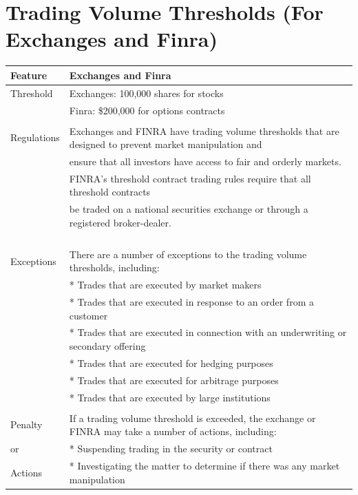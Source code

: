 \documentclass[11pt]{article}
\begin{document}
\section{Trading Volume Thresholds (For Exchanges and Finra)}
\label{sec:orgcc04caa}
\begin{center}
\begin{tabular}{ll}
\hline
Feature & Exchanges and Finra\\[0pt]
\hline
Threshold & Exchanges: 100,000 shares for stocks\\[0pt]
 & Finra:     \$200,000 for options contracts\\[0pt]
 & \\[0pt]
Regulations & Exchanges and FINRA have trading volume thresholds that are designed to prevent market manipulation and\\[0pt]
 & ensure that all investors have access to fair and orderly markets.\\[0pt]
 & FINRA's threshold contract trading rules require that all threshold contracts\\[0pt]
 & be traded on a national securities exchange or through a registered broker-dealer.\\[0pt]
 & \\[0pt]
 & \\[0pt]
 & \\[0pt]
 & \\[0pt]
Exceptions & There are a number of exceptions to the trading volume thresholds, including:\\[0pt]
 & * Trades that are executed by market makers\\[0pt]
 & * Trades that are executed in response to an order from a customer\\[0pt]
 & * Trades that are executed in connection with an underwriting or secondary offering\\[0pt]
 & * Trades that are executed for hedging purposes\\[0pt]
 & * Trades that are executed for arbitrage purposes\\[0pt]
 & * Trades that are executed by large institutions\\[0pt]
 & \\[0pt]
Penalty & If a trading volume threshold is exceeded, the exchange or FINRA may take a number of actions, including:\\[0pt]
or & * Suspending trading in the security or contract\\[0pt]
Actions & * Investigating the matter to determine if there was any market manipulation\\[0pt]

\end{tabular}
\end{center}
\end{document}
